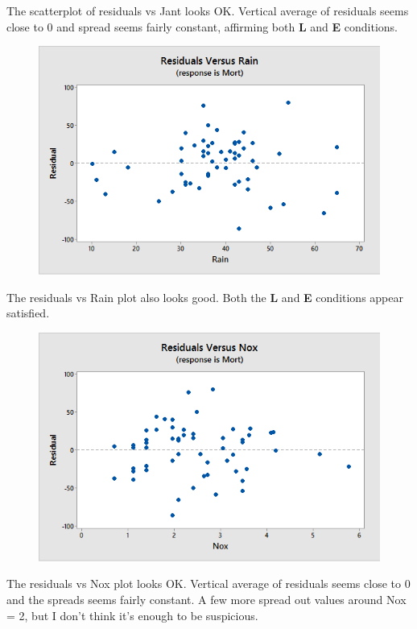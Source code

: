 \documentclass{article}
\begin{document}
The scatterplot of residuals vs Jant looks OK. Vertical average of
residuals seems close to 0 and spread seems fairly constant, affirming
both \textbf{L} and \textbf{E} conditions.

\newpage
\begin{figure}[h!]
 \centering
 \includegraphics[scale=.5]{./images/scatterplot_residuals-vs-Rain.png}
\end{figure}


The residuals vs Rain plot also looks good. Both the \textbf{L} and
\textbf{E} conditions appear satisfied.

\begin{figure}[h!]
 \centering
 \includegraphics[scale=.5]{./images/scatterplot_residuals-vs-Nox.png}
\end{figure}
The residuals vs Nox plot looks OK. Vertical average of residuals seems
close to 0 and the spreads seems fairly constant. A few more spread out
values around Nox = 2, but I don't think it's enough to be suspicious.
\end{document}

